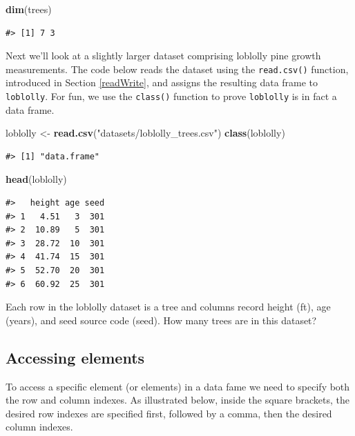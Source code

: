 \documentclass[
  11pt,
]{krantz}
\newenvironment{Shaded}{\begin{snugshade}}{\end{snugshade}}
\newcommand{\KeywordTok}[1]{\textcolor[rgb]{0.13,0.29,0.53}{\textbf{#1}}}
\newcommand{\NormalTok}[1]{#1}
\newcommand{\StringTok}[1]{\textcolor[rgb]{0.31,0.60,0.02}{#1}}
\theoremstyle{definition}
\theoremstyle{definition}
\theoremstyle{definition}
\theoremstyle{definition}
\theoremstyle{remark}
\begin{document}
\begin{Shaded}
\begin{Highlighting}[]
\KeywordTok{dim}\NormalTok{(trees)}
\end{Highlighting}
\end{Shaded}

\begin{verbatim}
#> [1] 7 3
\end{verbatim}

Next we'll look at a slightly larger dataset comprising loblolly pine growth measurements. The code below reads the dataset using the \texttt{read.csv()} function, introduced in Section \ref{readWrite}, and assigns the resulting data frame to \texttt{loblolly}. For fun, we use the \texttt{class()} function to prove \texttt{loblolly} is in fact a data frame.

\begin{Shaded}
\begin{Highlighting}[]
\NormalTok{loblolly \textless{}{-}}\StringTok{ }\KeywordTok{read.csv}\NormalTok{(}\StringTok{"datasets/loblolly\_trees.csv"}\NormalTok{)}
\KeywordTok{class}\NormalTok{(loblolly)}
\end{Highlighting}
\end{Shaded}

\begin{verbatim}
#> [1] "data.frame"
\end{verbatim}

\begin{Shaded}
\begin{Highlighting}[]
\KeywordTok{head}\NormalTok{(loblolly)}
\end{Highlighting}
\end{Shaded}

\begin{verbatim}
#>   height age seed
#> 1   4.51   3  301
#> 2  10.89   5  301
#> 3  28.72  10  301
#> 4  41.74  15  301
#> 5  52.70  20  301
#> 6  60.92  25  301
\end{verbatim}

Each row in the loblolly dataset is a tree and columns record height (ft), age (years), and seed source code (seed). How many trees are in this dataset?

\hypertarget{dataFrameSubsetting}{%
\subsection{Accessing elements}\label{dataFrameSubsetting}}

To access a specific element (or elements) in a data fame we need to specify both the row and column indexes. As illustrated below, inside the square brackets, the desired row indexes are specified first, followed by a comma, then the desired column indexes.
\end{document}
